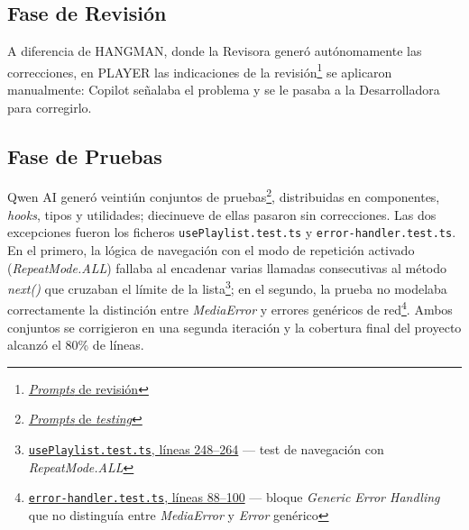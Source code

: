 \subsection{Fase de Revisión}

A diferencia de \ac{HANGMAN}, donde la Revisora generó autónomamente las correcciones, en \ac{PLAYER} las indicaciones de la revisión\footnote{\href{https://github.com/alu0101549491/TFG-Fabian-Gonzalez-Lence/tree/main/resources/prompts/2-MusicWebPlayer/4-RevisionPorModulo}{\textit{Prompts} de revisión}} se aplicaron manualmente: Copilot señalaba el problema y se le pasaba a la Desarrolladora para corregirlo.

\subsection{Fase de Pruebas}

Qwen AI generó veintiún conjuntos de pruebas\footnote{\href{https://github.com/alu0101549491/TFG-Fabian-Gonzalez-Lence/tree/main/resources/prompts/2-MusicWebPlayer/5-TestingPorModulo}{\textit{Prompts} de \textit{testing}}}, distribuidas en componentes, \textit{hooks}, tipos y utilidades; diecinueve de ellas pasaron sin correcciones. Las dos excepciones fueron los ficheros \texttt{usePlaylist.test.ts} y \texttt{error-handler.test.ts}. En el primero, la lógica de navegación con el modo de repetición activado (\textit{RepeatMode.ALL}) fallaba al encadenar varias llamadas consecutivas al método \textit{next()} que cruzaban el límite de la lista\footnote{\href{https://github.com/alu0101549491/TFG-Fabian-Gonzalez-Lence/blob/main/projects/2-MusicWebPlayer/tests/hooks/usePlaylist.test.ts\#L248-L264}{\texttt{usePlaylist.test.ts}, líneas 248--264} — test de navegación con \textit{RepeatMode.ALL}}; en el segundo, la prueba no modelaba correctamente la distinción entre \textit{MediaError} y errores genéricos de red\footnote{\href{https://github.com/alu0101549491/TFG-Fabian-Gonzalez-Lence/blob/main/projects/2-MusicWebPlayer/tests/utils/error-handler.test.ts\#L88-L100}{\texttt{error-handler.test.ts}, líneas 88--100} — bloque \textit{Generic Error Handling} que no distinguía entre \textit{MediaError} y \textit{Error} genérico}. Ambos conjuntos se corrigieron en una segunda iteración y la cobertura final del proyecto alcanzó el 80\% de líneas.

